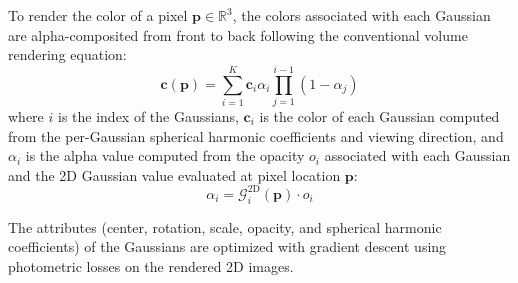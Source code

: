 To render the color of a pixel $\mathbf{p}\in \mathbb{R}^3$, the colors associated with each Gaussian are alpha-composited from front to back following the conventional volume rendering equation:
\begin{equation}
    \mathbf{c}(\mathbf{p}) = \sum_{i=1}^K \mathbf{c}_i \alpha_i \prod_{j=1}^{i-1}(1 - \alpha_j) \label{eq:3dgs_color}
\end{equation}
where $i$ is the index of the Gaussians, $\mathbf{c}_i$ is the color of each Gaussian computed from the per-Gaussian spherical harmonic coefficients and viewing direction, and $\alpha_i$ is the alpha value computed from the opacity $o_i$ associated with each Gaussian and the 2D Gaussian value evaluated at pixel location $\mathbf{p}$:
\begin{equation}
    \alpha_i = \mathcal{G}^{\text{2D}}_i(\mathbf{p})\cdot o_i
\end{equation}

The attributes (center, rotation, scale, opacity, and spherical harmonic coefficients) of the Gaussians are optimized with gradient descent using photometric losses on the rendered 2D images. 


